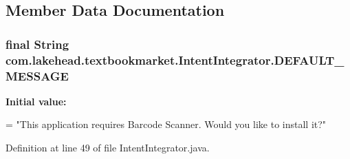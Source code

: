 \subsection{Member Data Documentation}
\hypertarget{classcom_1_1lakehead_1_1textbookmarket_1_1_intent_integrator_a67ebf8ab776193d62a32c5ac8a117361}{
\subsubsection[{D\-E\-F\-A\-U\-L\-T\-\_\-\-M\-E\-S\-S\-A\-G\-E}]{\setlength{\rightskip}{0pt plus 5cm}final String com.\-lakehead.\-textbookmarket.\-Intent\-Integrator.\-D\-E\-F\-A\-U\-L\-T\-\_\-\-M\-E\-S\-S\-A\-G\-E\hspace{0.3cm}{\ttfamily [static]}}}\label{classcom_1_1lakehead_1_1textbookmarket_1_1_intent_integrator_a67ebf8ab776193d62a32c5ac8a117361}
{\bfseries Initial value\-:}
\begin{DoxyCode}
=
            \textcolor{stringliteral}{"This application requires Barcode Scanner. Would you like to install it?"}
\end{DoxyCode}


Definition at line 49 of file Intent\-Integrator.\-java.

